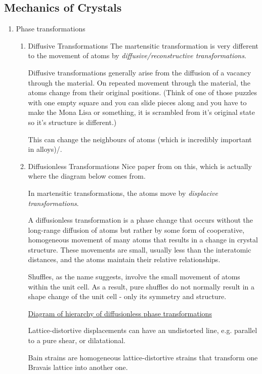 \documentclass[11pt]{article}
\begin{document}
\subsection{Mechanics of Crystals}
\label{sec:org23452ce}
\begin{enumerate}
\item Phase transformations
\label{sec:org40f824a}
\begin{enumerate}
\item Diffusive Transformations
\label{sec:org8c42396}
The martensitic transformation is very different to the movement of atoms by
\emph{diffusive/reconstructive transformations}. 

Diffusive transformations generally arise from the diffusion of a vacancy
through the material. On repeated movement through the material, the atoms
change from their original positions. (Think of one of those puzzles with one
empty square and you can slide pieces along and you have to make the Mona Lisa or
something, it is scrambled from it's original state so it's structure is different.)

This can change the neighbours of atoms (which is incredibly important in
alloys)/. 

\item Diffusionless Transformations
\label{sec:org2ee1d3d}
Nice paper from \cite{Christian1995} on this, which is actually where the
diagram below comes from. 

In martensitic transformations, the atoms move by
 \emph{displacive transformations}.

A diffusionless transformation is a phase change that occurs without the
long-range diffusion of atoms but rather by some form of cooperative, 
homogeneous movement of many atoms that results in a change in crystal 
structure. These movements are small, usually less than the interatomic
 distances, and the atoms maintain their relative relationships. 

Shuffles, as the name suggests, involve the small movement of atoms within the
unit cell. As a result, pure shuffles do not normally result in a shape change
of the unit cell - only its symmetry and structure. 

\href{Images/Diffusionless\_classification.svg}{Diagram of hierarchy of diffusionless phase transformations}

Lattice-distortive displacements can have an undistorted line, e.g. parallel
to a pure shear, or dilatational. 

Bain strains are homogeneous lattice-distortive strains that transform one
Bravais lattice into another one. 


\end{enumerate}
\end{enumerate}
\end{document}
